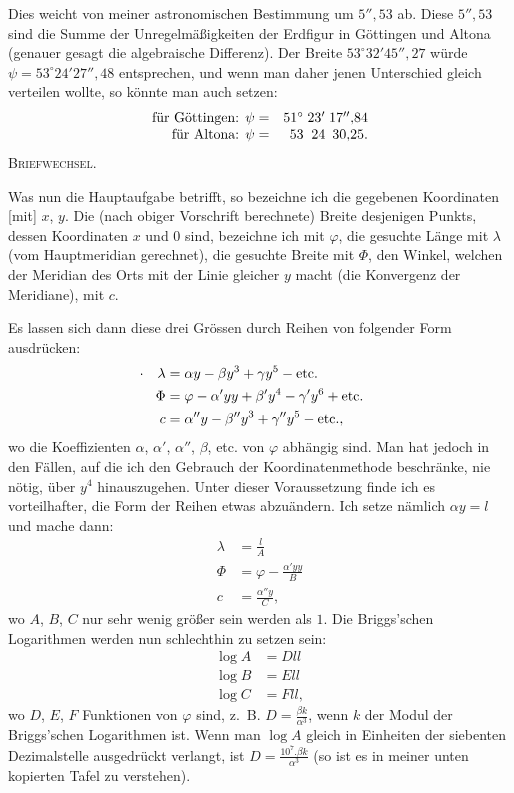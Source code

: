 Dies weicht von meiner astronomischen Bestimmung um $5''{,}53$ ab. Diese $5''{,}53$ sind die Summe der Unregelmäßigkeiten der Erdfigur in Göttingen und Altona (genauer gesagt die algebraische Differenz). Der Breite $53^\circ32'45''{,}27$ würde $\psi=53^\circ24'27''{,}48$ entsprechen, und wenn man daher jenen Unterschied gleich verteilen wollte, so könnte man auch setzen:
\[
\begin{array}{r@{\quad}r@{\;}r@{\;}r}
\text{für Göttingen: }\psi=&51^\circ&23'&17''{,}84\\
\text{für Altona: }\psi=&53&24&30{,}25.
\end{array}
\]
\clearpage
{}\hfill\textsc{Briefwechsel.}\hfill\mbox{}\par\medskip
Was nun die Hauptaufgabe betrifft, so bezeichne ich die gegebenen Koordinaten [mit] $x$, $y$. Die (nach obiger Vorschrift berechnete) Breite desjenigen Punkts, dessen Koordinaten $x$ und $0$ sind, bezeichne ich mit $\varphi$, die gesuchte Länge mit $\lambda$ (vom Hauptmeridian gerechnet), die gesuchte Breite mit $\Phi$, den Winkel, welchen der Meridian des Orts mit der Linie gleicher $y$ macht (die Konvergenz der Meridiane), mit $c$.

Es lassen sich dann diese drei Grössen durch Reihen von folgender Form ausdrücken:
\[
\begin{aligned}
\llap{\text{\raisebox{.45ex}{.}\hspace{1em}}}\lambda&=\alpha y-\beta y^3+\gamma y^5-\text{etc.}\\
\Phi&=\varphi-\alpha'yy+\beta'y^4-\gamma'y^6+\text{etc.}\\
c&=\alpha''y-\beta''y^3+\gamma''y^5-\text{etc.},
\end{aligned}
\]
wo die Koeffizienten $\alpha$, $\alpha'$, $\alpha''$, $\beta$, etc. von $\varphi$ abhängig sind. Man hat jedoch in den Fällen, auf die ich den Gebrauch der Koordinatenmethode beschränke, nie nötig, über $y^4$ hinauszugehen. Unter dieser Voraussetzung finde ich es vorteilhafter, die Form der Reihen etwas abzuändern. Ich setze nämlich $\alpha y=l$ und mache dann:
\[
\begin{aligned}
\lambda&=\frac lA\\
\Phi&=\varphi-\frac{\alpha'yy}{B}\\
c&=\frac{\alpha''y}{C},
\end{aligned}
\]
wo $A$, $B$, $C$ nur sehr wenig größer sein werden als $1$. Die Briggs'schen Logarithmen werden nun schlechthin zu setzen sein:
\[
\begin{aligned}
\log A&=Dll\\
\log B&=Ell\\
\log C&=Fll,
\end{aligned}
\]
wo $D$, $E$, $F$ Funktionen von $\varphi$ sind, z.~B. $D=\frac{\beta k}{\alpha^3}$, wenn $k$ der Modul der Briggs'schen Logarithmen ist. Wenn man $\log A$ gleich in Einheiten der siebenten Dezimalstelle ausgedrückt verlangt, ist $D=\frac{10^7.\beta k}{\alpha^3}$ (so ist es in meiner unten kopierten Tafel zu verstehen).

